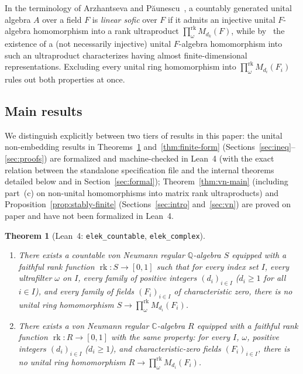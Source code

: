 \documentclass[11pt]{article}
\newtheorem{theorem}{Theorem}[section]
\theoremstyle{definition}
\theoremstyle{remark}
\numberwithin{equation}{section}
\DeclareMathOperator{\rk}{rk}
\newcommand{\RUF}[3]{\prod_{#1}^{\mathrm{rk}} M_{#2}(#3)}
\newcommand{\Q}{\mathbb{Q}}
\newcommand{\C}{\mathbb{C}}
\newcommand{\1}{\mathbf{1}}
\newcommand{\code}[1]{{\normalfont\small\texttt{#1}}}
\begin{document}
In the terminology of Arzhantseva and P\u{a}unescu~\cite[Definition~4.2]{AP2017}, a countably generated unital algebra $A$ over a field $F$ is \emph{linear sofic} over $F$ if it admits an injective unital $F$-algebra homomorphism into a rank ultraproduct $\prod_\omega^{\mathrm{rk}} M_{d_k}(F)$, while by~\cite[Proposition~11.2]{AP2017} the existence of a (not necessarily injective) unital $F$-algebra homomorphism into such an ultraproduct characterizes having almost finite-dimensional representations. Excluding every unital ring homomorphism into $\prod_\omega^{\mathrm{rk}} M_{d_i}(F_i)$ rules out both properties at once.

\subsection{Main results}

We distinguish explicitly between two tiers of results in this paper: the unital non-embedding results in Theorems~\ref{thm:main-ultra} and~\ref{thm:finite-form} (Sections~\ref{sec:ineq}--\ref{sec:proofs}) are formalized and machine-checked in Lean~4 (with the exact relation between the standalone specification file and the internal theorems detailed below and in Section~\ref{sec:formal}); Theorem~\ref{thm:vn-main} (including part~(c) on non-unital homomorphisms into matrix rank ultraproducts) and Proposition~\ref{prop:stably-finite} (Sections~\ref{sec:intro} and~\ref{sec:vn}) are proved on paper and have not been formalized in Lean~4.

\begin{theorem}[Lean~4: \code{elek\_countable}, \code{elek\_complex}]
\label{thm:main-ultra}
\leavevmode
\begin{enumerate}[label=\textup{(\alph*)},leftmargin=2.2em]
\item There exists a countable von Neumann regular $\Q$-algebra $S$ equipped with a faithful rank function $\rk\colon S \to [0,1]$ such that for every index set $I$, every ultrafilter $\omega$ on $I$, every family of positive integers $(d_i)_{i \in I}$ ($d_i \ge 1$ for all $i \in I$), and every family of fields $(F_i)_{i \in I}$ of characteristic zero, there is no unital ring homomorphism $S \to \RUF{\omega}{d_i}{F_i}$.
\item There exists a von Neumann regular $\C$-algebra $R$ equipped with a faithful rank function $\rk\colon R \to [0,1]$ with the same property: for every $I$, $\omega$, positive integers $(d_i)_{i \in I}$ ($d_i \ge 1$), and characteristic-zero fields $(F_i)_{i \in I}$, there is no unital ring homomorphism $R \to \RUF{\omega}{d_i}{F_i}$.
\end{enumerate}
\end{theorem}
\end{document}
